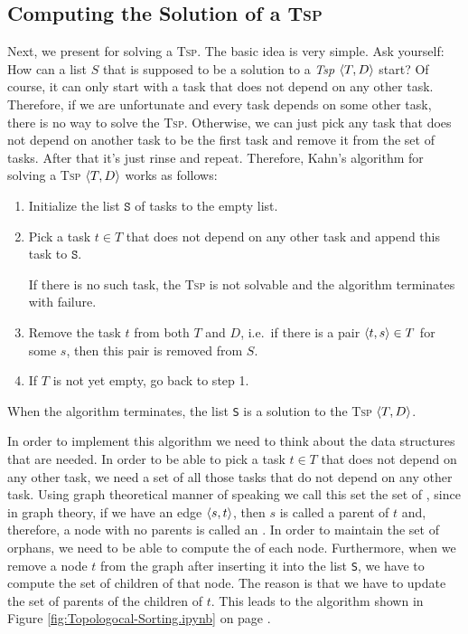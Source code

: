 \subsection{Computing the Solution of a \textsc{Tsp}}
Next, we present  \cite{kahn:1962} for solving a \textsc{Tsp}.  The basic idea is very
simple. Ask yourself:  How can a list $S$ that is supposed to be a solution to a \textsl{Tsp} $\pair(T, D)$ start?
Of course, it can only start with a task that does not depend on any other task.  Therefore, if we are
unfortunate and every task depends on some other task, there is no way to solve the \textsc{Tsp}.  Otherwise,
we can just pick any task that does not depend on another task to be the first task and remove it from the set
of tasks.  After that it's just rinse and repeat.  Therefore, Kahn's algorithm for solving a \textsc{Tsp}
$\pair(T, D)$ works as follows: 
\begin{enumerate}
\item Initialize the list $\texttt{S}$ of tasks to the empty list.
\item Pick a task $t \in T$ that does not depend on any other task and append this task to $\texttt{S}$.

      If there is no such task, the \textsc{Tsp} is not solvable and the algorithm terminates with failure.
\item Remove the task $t$ from both $T$ and $D$, i.e.~if there is a pair $\pair(t, s) \in T$ for some $s$, then
      this pair is removed from $S$.
\item If $T$ is not yet empty, go back to step 1.  
\end{enumerate}
When the algorithm terminates, the list \texttt{S} is a solution to the \textsc{Tsp} $\pair(T, D)$.

In order to implement this algorithm we need to think about the data structures that are needed.
In order to be able to pick a task $t \in T$ that does not depend on any other task, we need a set of all those
tasks that do not depend on any other task.  Using graph theoretical manner of speaking we call this set the
set of , since in graph theory, if we have an edge $\pair(s, t)$, then $s$ is called a parent of
$t$ and, therefore, a node with no parents is called an .  In order to maintain the set of
orphans, we need to be able to compute the  of each node.  Furthermore, when we remove a node $t$
from the graph after inserting it into the list \texttt{S}, we have to compute the set of children of that
node.  The reason is that we have to update the set of parents of the children of $t$.  This leads to the algorithm
shown in Figure \ref{fig:Topologocal-Sorting.ipynb} on page \pageref{fig:Topologocal-Sorting.ipynb}.


